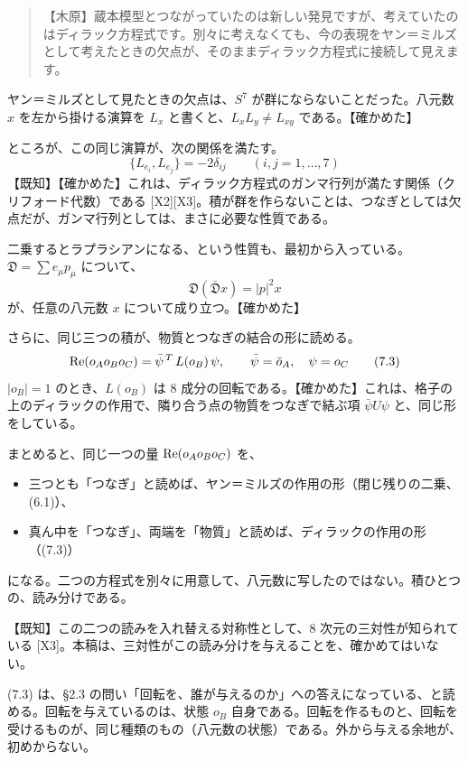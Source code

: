 \documentclass[
  a4paper,
]{ltjsarticle}
\providecommand{\tightlist}{%
  \setlength{\itemsep}{0pt}\setlength{\parskip}{0pt}}
\begin{document}
\begin{quote}
【木原】蔵本模型とつながっていたのは新しい発見ですが、考えていたのはディラック方程式です。別々に考えなくても、今の表現をヤン＝ミルズとして考えたときの欠点が、そのままディラック方程式に接続して見えます。
\end{quote}

ヤン＝ミルズとして見たときの欠点は、\(S^7\)
が群にならないことだった。八元数 \(x\) を左から掛ける演算を \(L_x\)
と書くと、\(L_xL_y \ne L_{xy}\) である。【確かめた】

ところが、この同じ演算が、次の関係を満たす。 \[
\{L_{e_i}, L_{e_j}\} = -2\delta_{ij}\qquad(i, j = 1, \dots, 7) \tag{7.1}
\]
【既知】【確かめた】これは、ディラック方程式のガンマ行列が満たす関係（クリフォード代数）である
{[}X2{]}{[}X3{]}。積が群を作らないことは、つなぎとしては欠点だが、ガンマ行列としては、まさに必要な性質である。

二乗するとラプラシアンになる、という性質も、最初から入っている。\(\mathfrak{D} = \sum e_\mu p_\mu\)
について、 \[
\mathfrak{D}(\bar{\mathfrak{D}}x) = \lvert p\rvert^2 x \tag{7.2}
\] が、任意の八元数 \(x\) について成り立つ。【確かめた】

さらに、同じ三つの積が、物質とつなぎの結合の形に読める。 \[
{\rm Re}(o_Ao_Bo_C) = \bar\psi^{\,T}\,L(o_B)\,\psi,\qquad \bar\psi = \bar o_A,\quad \psi = o_C \tag{7.3}
\] \(\lvert o_B\rvert = 1\) のとき、\(L(o_B)\) は 8
成分の回転である。【確かめた】これは、格子の上のディラックの作用で、隣り合う点の物質をつなぎで結ぶ項
\(\bar\psi U\psi\) と、同じ形をしている。

まとめると、同じ一つの量 \({\rm Re}(o_Ao_Bo_C)\) を、

\begin{itemize}
\tightlist
\item
  三つとも「つなぎ」と読めば、ヤン＝ミルズの作用の形（閉じ残りの二乗、(6.1)）、
\item
  真ん中を「つなぎ」、両端を「物質」と読めば、ディラックの作用の形（(7.3)）
\end{itemize}

になる。二つの方程式を別々に用意して、八元数に写したのではない。積ひとつの、読み分けである。

【既知】この二つの読みを入れ替える対称性として、8
次元の三対性が知られている
{[}X3{]}。本稿は、三対性がこの読み分けを与えることを、確かめてはいない。

(7.3) は、§2.3
の問い「回転を、誰が与えるのか」への答えになっている、と読める。回転を与えているのは、状態
\(o_B\)
自身である。回転を作るものと、回転を受けるものが、同じ種類のもの（八元数の状態）である。外から与える余地が、初めからない。
\end{document}

